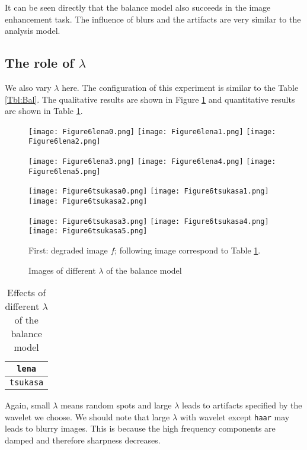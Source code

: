 \documentclass[english, nochinese]{pnote}
\begin{document}
It can be seen directly that the balance model also succeeds in the image enhancement task. The influence of blurs and the artifacts are very similar to the analysis model.

\subsection{The role of $\lambda$}

We also vary $\lambda$ here. The configuration of this experiment is similar to the Table \ref{Tbl:Bal}. The qualitative results are shown in Figure \ref{Fig:BalLam} and quantitative results are shown in Table \ref{Tbl:BalLam}.

\begin{figure}[htbp]
{
\centering

\texttt{[image: Figure6lena0.png]}
\texttt{[image: Figure6lena1.png]}
\texttt{[image: Figure6lena2.png]}

\texttt{[image: Figure6lena3.png]}
\texttt{[image: Figure6lena4.png]}
\texttt{[image: Figure6lena5.png]}

\texttt{[image: Figure6tsukasa0.png]}
\texttt{[image: Figure6tsukasa1.png]}
\texttt{[image: Figure6tsukasa2.png]}

\texttt{[image: Figure6tsukasa3.png]}
\texttt{[image: Figure6tsukasa4.png]}
\texttt{[image: Figure6tsukasa5.png]}

\caption{Images of different $\lambda$ of the balance model}
\label{Fig:BalLam}
}
{
\footnotesize First: degraded image $f$; following image correspond to Table \ref{Tbl:BalLam}.
}
\end{figure}

\begin{table}[htbp]
\centering
\begin{tabular}{|c|c|c|c|c|c|c|}
\hline
\multicolumn{7}{|c|}{\texttt{lena}} \\
\hline

\multicolumn{7}{|c|}{\texttt{tsukasa}} \\
\hline

\end{tabular}
\caption{Effects of different $\lambda$ of the balance model}
\label{Tbl:BalLam}
\end{table}

Again, small $\lambda$ means random spots and large $\lambda$ leads to artifacts specified by the wavelet we choose. We should note that large $\lambda$ with wavelet except \verb"haar" may leads to blurry images. This is because the high frequency components are damped and therefore sharpness decreases.
\end{document}
